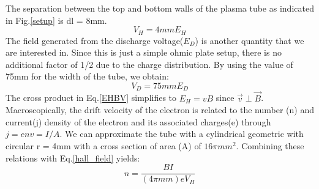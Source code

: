 \documentclass{sigchi}
\begin{document}
The separation between the top and bottom walls of the plasma tube as indicated in Fig.\ref{setup} is dl = 8mm. 
\begin{equation}
V_H  = 4mm E_H
\label{hall_field}
\end{equation}
The field generated from the discharge voltage($E_D$) is another quantity that we are interested in. Since this is just a simple ohmic plate setup, there is no additional factor of 1/2 due to the charge distribution. By using the value of 75mm for the width of the tube, we obtain: 
\begin{equation}
V_D  = 75mm E_D
\label{ohmic_field}
\end{equation}
The cross product in Eq.\ref{EHBV} simplifies to $E_H = v B$ since $\vec{v} \perp \vec{B}$. Macroscopically, the drift velocity of the electron  is related to the number (n) and current(j) density of the electron and its associated charges(e)  through $j=env=I/A$. We can approximate the tube with a cylindrical geometric with circular r = 4mm with a cross section of area (A) of $16\pi mm^2$.  Combining these relations with Eq.\ref{hall_field} yields: 
\begin{equation}
n  = \frac{BI}{(4\pi mm) e V_H}
\end{equation}
\end{document}
